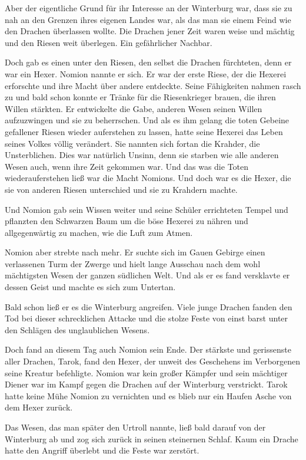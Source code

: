 \documentclass[10pt, a4paper, oneside]{book}
\begin{document}
\begin{multicols}{2}
Aber der eigentliche Grund für ihr Interesse an der Winterburg war, dass sie zu nah an den Grenzen ihres eigenen Landes war, als das man sie einem Feind wie den Drachen überlassen wollte. Die Drachen jener Zeit waren weise und mächtig und den Riesen weit überlegen. Ein gefährlicher Nachbar.\bigskip

Doch gab es einen unter den Riesen, den selbst die Drachen fürchteten, denn er war ein Hexer. Nomion nannte er sich. Er war der erste Riese, der die Hexerei erforschte und ihre Macht über andere entdeckte. Seine Fähigkeiten nahmen rasch zu und bald schon konnte er Tränke für die Riesenkrieger brauen, die ihren Willen stärkten. Er entwickelte die Gabe, anderen Wesen seinen Willen aufzuzwingen und sie zu beherrschen. Und als es ihm gelang die toten Gebeine gefallener Riesen wieder auferstehen zu lassen, hatte seine Hexerei das Leben seines Volkes völlig verändert. Sie nannten sich fortan die Krahder, die Unsterblichen. Dies war natürlich Unsinn, denn sie starben wie alle anderen Wesen auch, wenn ihre Zeit gekommen war. Und das was die Toten wiederauferstehen ließ war die Macht Nomions. Und doch war es die Hexer, die sie von anderen Riesen unterschied und sie zu Krahdern machte.\bigskip

Und Nomion gab sein Wissen weiter und seine Schüler errichteten Tempel und pflanzten den Schwarzen Baum um die böse Hexerei zu nähren und allgegenwärtig zu machen, wie die Luft zum Atmen.\bigskip

Nomion aber strebte nach mehr. Er suchte sich im Gauen Gebirge einen verlassenen Turm der Zwerge und hielt lange Ausschau nach dem wohl mächtigsten Wesen der ganzen südlichen Welt. Und als er es fand versklavte er dessen Geist und machte es sich zum Untertan.\bigskip

Bald schon ließ er es die Winterburg angreifen. Viele junge Drachen fanden den Tod bei dieser schrecklichen Attacke und die stolze Feste von einst barst unter den Schlägen des unglaublichen Wesens.\bigskip

Doch fand an diesem Tag auch Nomion sein Ende. Der stärkste und gerissenste aller Drachen, Tarok, fand den Hexer, der unweit des Geschehens im Verborgenen seine Kreatur befehligte. Nomion war kein großer Kämpfer und sein mächtiger Diener war im Kampf gegen die Drachen auf der Winterburg verstrickt. Tarok hatte keine Mühe Nomion zu vernichten und es blieb nur ein Haufen Asche von dem Hexer zurück.\bigskip

Das Wesen, das man später den Urtroll nannte, ließ bald darauf von der Winterburg ab und zog sich zurück in seinen steinernen Schlaf. Kaum ein Drache hatte den Angriff überlebt und die Feste war zerstört.\bigskip


\end{multicols}
\end{document}
